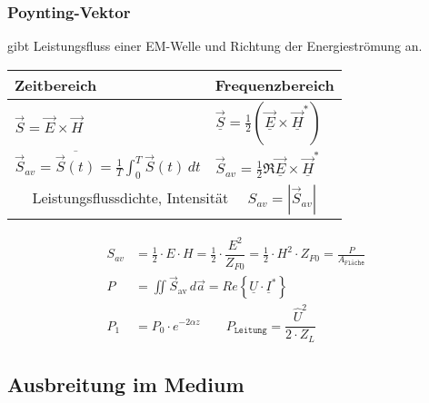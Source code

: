 \subsubsection{Poynting-Vektor}
gibt Leistungsfluss einer EM-Welle und Richtung der Energieströmung an.\\
\begin{tabular}{|l|l|}
	\hline
	Zeitbereich & Frequenzbereich\\
	\hline
	$\vec{S} = \vec{E} \times \vec{H}$ & $\vec{\underline{S}} = \frac{1}{2} (\underline{\vec{E}} \times \underline{\vec{H}}^*)$ \\
	$\vec{S}_{av} = \overline{\vec{S}(t)} = \frac{1}{T} \int_{0}^{T} \vec{S}(t) \,dt $ & $\vec{S}_{av} = \frac{1}{2} \Re{\underline{\vec{E}} \times \underline{\vec{H}}^*}$\\
	\hline
	\multicolumn{2}{|c|}{Leistungsflussdichte, Intensität $\quad S_{av} = |\vec{S}_{av}|$}\\
	\hline
\end{tabular}
\begin{align*}
	S_{av}              & =  \frac{1}{2} \cdot E \cdot H 
	=  \frac{1}{2} \cdot \dfrac{E^2}{Z_{F0}}            
	=  \frac{1}{2} \cdot H^2 \cdot Z_{F0} 
	=  \frac{P}{A_\texttt{Fläche}}\\
	P &= \iint\vec{S}_{\text{av}}\, d\vec{a}                
	= Re\left\{\underline{U}\cdot\underline{I}^*\right\}\\
	P_1 & = P_0 \cdot e^{-2\alpha z} \qquad P_{\texttt{Leitung}} = \dfrac{\hat{U}^2}{2\cdot Z_L}
\end{align*}
\subsection{Ausbreitung im Medium}
